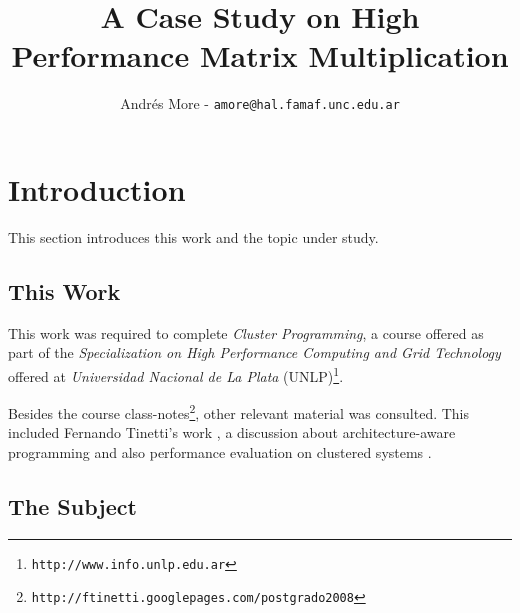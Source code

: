 \documentclass[a4paper,twocolumn]{article}
\begin{document}
\title{A Case Study on High Performance Matrix Multiplication}
\author{Andr\'{e}s More - {\tt amore@hal.famaf.unc.edu.ar}}
\date{}


\tableofcontents

\section{Introduction}

This section introduces this work and the topic under study.

\subsection{This Work}

This work was required to complete {\it Cluster Programming}, a course offered as part of the {\it Specialization on High Performance Computing and Grid Technology} offered at {\it Universidad Nacional de La Plata} (UNLP)\footnote{\tt http://www.info.unlp.edu.ar}.

\smallskip

Besides the course class-notes\footnote{\tt http://ftinetti.googlepages.com/postgrado2008}, other relevant material was consulted. This included Fernando 
Tinetti's work \cite{ftinetti}, a discussion about architecture-aware 
programming \cite{cpumemory} and also performance evaluation on clustered 
systems \cite{beowulf}.

\subsection{The Subject}
\end{document}
